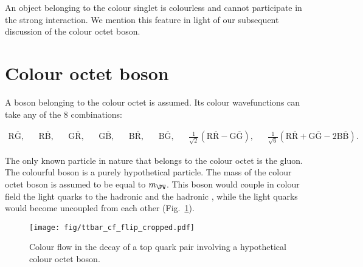An object belonging to the colour singlet is colourless and cannot participate in the strong interaction. We mention this feature in light of our subsequent discussion of the colour octet \PW boson.

\section{Colour octet \PW boson}

A \PW boson belonging to the colour octet is assumed. Its colour wavefunctions can take any of the 8 combinations:

\begin{align}
\text{R}\overline{\text{G}}, &&
\text{R}\overline{\text{B}}, &&
\text{G}\overline{\text{R}}, &&
\text{G}\overline{\text{B}}, &&
\text{B}\overline{\text{R}}, &&
\text{B}\overline{\text{G}}, &&
\frac{1}{\sqrt{2}}\left(\text{R}\overline{\text{R}}-\text{G}\overline{\text{G}}\right), &&
\frac{1}{\sqrt{6}}\left(\text{R}\overline{\text{R}}+\text{G}\overline{\text{G}}-2\text{B}\overline{\text{B}}\right).
\end{align}

The only known particle in nature that belongs to the colour octet is the gluon. The colourful \PW boson is a purely hypothetical particle. The mass of the colour octet \PW boson is assumed to be equal to $m_{\PW}$. This boson would couple in colour field the light quarks to the hadronic \cPqb and the hadronic \cPqt, while the light quarks would become uncoupled from each other (Fig.~\ref{fig:ttbar_cf_octet}).

  \begin{figure}[h!]
  \centering
  \texttt{[image: fig/ttbar\_cf\_flip\_cropped.pdf]}
  \caption{Colour flow in the decay of a top quark pair involving a hypothetical colour octet \PW boson.}
  \label{fig:ttbar_cf_octet}
\end{figure}

